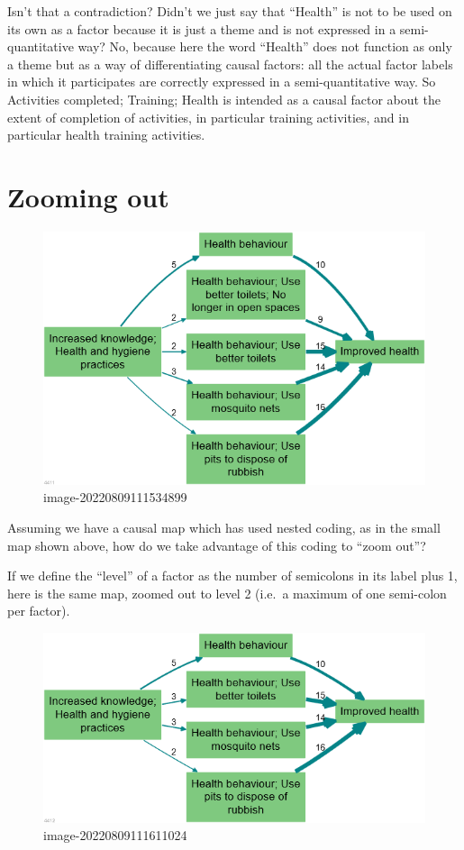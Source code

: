 \documentclass[
]{book}
\begin{document}
Isn't that a contradiction? Didn't we just say that ``Health'' is not to be used on its own as a factor because it is just a theme and is not expressed in a semi-quantitative way? No, because here the word ``Health'' does not function as only a theme but as a way of differentiating causal factors: all the actual factor labels in which it participates are correctly expressed in a semi-quantitative way. So Activities completed; Training; Health is intended as a causal factor about the extent of completion of activities, in particular training activities, and in particular health training activities.

\hypertarget{zooming-out}{%
\section{Zooming out}\label{zooming-out}}

\begin{figure}
\centering
\includegraphics[width=6.77083in,height=\textheight]{_assets/image-20220809111534899.png}
\caption{image-20220809111534899}
\end{figure}

Assuming we have a causal map which has used nested coding, as in the small map shown above, how do we take advantage of this coding to ``zoom out''?

If we define the ``level'' of a factor as the number of semicolons in its label plus 1, here is the same map, zoomed out to level 2 (i.e.~a maximum of one semi-colon per factor).

\begin{figure}
\centering
\includegraphics[width=6.77083in,height=\textheight]{_assets/image-20220809111611024.png}
\caption{image-20220809111611024}
\end{figure}
\end{document}
